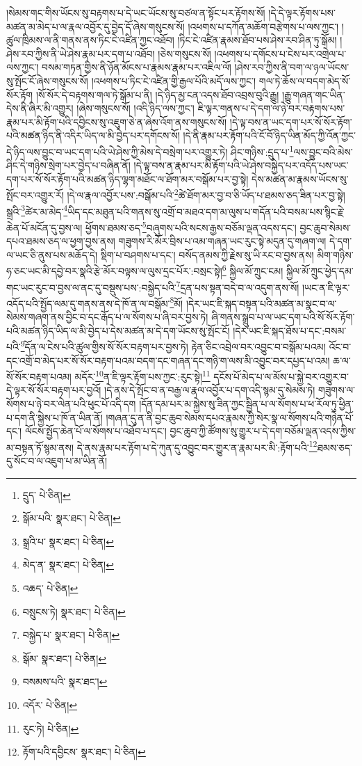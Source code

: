 །སེམས་གང་གིས་ཡོངས་སུ་བརྟགས་པ་དེ་ཡང་ཡོངས་སུ་བཙལ་ན་སྟོང་པར་རྟོགས་སོ། །དེ་དེ་ལྟར་རྟོགས་པས་མཚན་མ་མེད་པ་ལ་རྣལ་འབྱོར་དུ་བྱེད་དོ་ཞེས་གསུངས་སོ། །འཕགས་པ་དཀོན་མཆོག་བརྩེགས་པ་ལས་ཀྱང་། །ཚུལ་ཁྲིམས་ལ་ནི་གནས་ནས་ཏིང་ངེ་འཛིན་ཀྱང་འཐོབ། །ཏིང་ངེ་འཛིན་རྣམས་ཐོབ་པས་ཤེས་རབ་ཤིན་ཏུ་སྒོམ། །ཤེས་རབ་ཀྱིས་ནི་ཡེ་ཤེས་རྣམ་པར་དག་པ་འཐོབ། །ཅེས་གསུངས་སོ། །འཕགས་པ་དགོངས་པ་ངེས་པར་འགྲེལ་པ་ལས་ཀྱང་། བསམ་གཏན་གྱིས་ནི་ཉོན་མོངས་པ་རྣམས་རྣམ་པར་འཇིལ་ལོ། །ཤེས་རབ་ཀྱིས་ནི་བག་ལ་ཉལ་ཡོངས་སུ་སྤོང་ངོ་ཞེས་གསུངས་སོ། །འཕགས་པ་ཏིང་ངེ་འཛིན་གྱི་རྒྱལ་པོའི་མདོ་ལས་ཀྱང་། གལ་ཏེ་ཆོས་ལ་བདག་མེད་སོ་སོར་རྟོག །སོ་སོར་དེ་བརྟགས་གལ་ཏེ་སྒོམ་པ་ནི། །དེ་ཉིད་མྱ་ངན་འདས་ཐོབ་འབྲས་བུའི་རྒྱུ། །རྒྱུ་གཞན་གང་ཡིན་དེས་ནི་ཞིར་མི་འགྱུར། །ཞེས་གསུངས་སོ། །འདི་ཉིད་ལས་ཀྱང་། ཇི་ལྟར་གནས་པ་དེ་དག་ལ་ཉེ་བར་བརྟགས་པས་རྣམ་པར་མི་རྟོག་པའི་དབྱིངས་སུ་འཇུག་ཅེ་ན་ཞེས་འོག་ནས་གསུངས་སོ། །དེ་ལྟ་བས་ན་ཡང་དག་པར་སོ་སོར་རྟོག་པའི་མཚན་ཉིད་ནི་འདིར་ཡིད་ལ་མི་བྱེད་པར་དགོངས་སོ། །དེ་ནི་རྣམ་པར་རྟོག་པའི་ངོ་བོ་ཉིད་ཡིན་མོད་ཀྱི་འོན་ཀྱང་དེ་ཉིད་ལས་བྱུང་བ་ཡང་དག་པའི་ཡེ་ཤེས་ཀྱི་མེས་དེ་བསྲེག་པར་འགྱུར་ཏེ། ཤིང་གཉིས་:དྲུད་པ་\footnote{དྲུད་  པེ་ཅིན། }ལས་བྱུང་བའི་མེས་ཤིང་དེ་གཉིས་སྲེག་པར་བྱེད་པ་བཞིན་ནོ། །དེ་ལྟ་བས་ན་རྣམ་པར་མི་རྟོག་པའི་ཡེ་ཤེས་བསྐྱེད་པར་འདོད་པས་ཡང་དག་པར་སོ་སོར་རྟོག་པའི་མཚན་ཉིད་ལྷག་མཐོང་ལ་ཐོག་མར་བསྒོམ་པར་བྱ་སྟེ། དེས་མཚན་མ་རྣམས་ཡོངས་སུ་སྤོང་བར་འགྱུར་རོ། །དེ་ལ་རྣལ་འབྱོར་པས་:བསྒོམ་པའི་\footnote{སྒོམ་པའི་  སྣར་ཐང་།  པེ་ཅིན། }ཚེ་ཐོག་མར་བྱ་བ་ཅི་ཡོད་པ་ཐམས་ཅད་ཟིན་པར་བྱ་སྟེ། སྒྲའི་\footnote{སྒྲའི་པ་  སྣར་ཐང་།  པེ་ཅིན། }ཚེར་མ་མེད་\footnote{མེད་ན་  སྣར་ཐང་།  པེ་ཅིན། }ཡིད་དང་མཐུན་པའི་གནས་སུ་འགྲོ་བ་མཐའ་དག་མ་ལུས་པ་གདོན་པའི་བསམ་པས་སྙིང་རྗེ་ཆེན་པོ་མངོན་དུ་བྱས་ལ། ཕྱོགས་ཐམས་ཅད་\footnote{འཆད་  པེ་ཅིན། }བཞུགས་པའི་སངས་རྒྱས་བཅོམ་ལྡན་འདས་དང་། བྱང་ཆུབ་སེམས་དཔའ་ཐམས་ཅད་ལ་ཕྱག་བྱས་ནས། གཟུགས་རི་མོར་བྲིས་པ་འམ་གཞན་ཡང་རུང་སྟེ་མདུན་དུ་གཞག་ལ། དེ་དག་ལ་ཡང་ཅི་ནུས་པས་མཆོད་དེ། སྡིག་པ་བཤགས་པ་དང་། བསོད་ནམས་ཀྱི་རྗེས་སུ་ཡི་རང་བ་བྱས་ནས། མིག་གཉིས་ཧ་ཅང་ཡང་མི་དབྱེ་བར་སྣའི་རྩེ་མོར་བལྟས་ལ་ལུས་དྲང་པོར་:བསྲང་སྟེ།\footnote{བསྲུངས་ཏེ།  སྣར་ཐང་།  པེ་ཅིན། } སྐྱིལ་མོ་ཀྲུང་ངམ། སྐྱིལ་མོ་ཀྲུང་ཕྱེད་དམ་གང་ཡང་རུང་བ་བྱས་ལ་ནང་དུ་བསྡུས་པས་:བསྐྱེད་པའི་\footnote{བསྐྱེད་པ་  སྣར་ཐང་།  པེ་ཅིན། }དྲན་པས་སྟན་བདེ་བ་ལ་འདུག་ནས་སོ། །ཡང་ན་ཇི་ལྟར་འདོད་པའི་སྤྱོད་ལམ་དུ་གནས་ནས་དེ་ཁོ་ན་ལ་བསྒོམ་\footnote{སྒོམ་  སྣར་ཐང་།  པེ་ཅིན། }མོ། །དེར་ཡང་ཇི་སྐད་བསྟན་པའི་མཚན་མ་སྣང་བ་ལ་སེམས་གཞག་ནས་བྱིང་བ་དང་རྒོད་པ་ལ་སོགས་པ་ཞི་བར་བྱས་ཏེ། ཞི་གནས་སྒྲུབ་པ་ལ་ཡང་དག་པའི་སོ་སོར་རྟོག་པའི་མཚན་ཉིད་ཡིད་ལ་མི་བྱེད་པ་དེས་མཚན་མ་དེ་དག་ཡོངས་སུ་སྤོང་ངོ། །དེར་ཡང་ཇི་སྐད་ཐོས་པ་དང་:བསམ་པའི་\footnote{བསམས་པའི་  སྣར་ཐང་། }དོན་ལ་ངེས་པའི་ཚུལ་གྱིས་སོ་སོར་བརྟག་པར་བྱས་ཏེ། རྟེན་ཅིང་འབྲེལ་བར་འབྱུང་བ་བསྒོམ་པའམ། འོང་བ་དང་འགྲོ་བ་མེད་པར་སོ་སོར་བརྟག་པའམ་བདག་དང་གཞན་དང་གཉི་ག་ལས་མི་འབྱུང་བར་དཔྱད་པ་འམ། ཆ་ལ་སོ་སོར་བརྟག་པའམ། མདོར་\footnote{འདོར་  པེ་ཅིན། }ན་ཇི་ལྟར་རྟོག་པས་ཀྱང་:རུང་སྟེ།\footnote{རུང་ཏེ།  པེ་ཅིན། } དངོས་པོ་མེད་པ་ལ་མོས་པ་སྐྱེ་བར་འགྱུར་བ་དེ་ལྟར་སོ་སོར་བརྟག་པར་བྱའོ། །དེ་ནས་དེ་སྤོང་བ་ན་བརྒྱ་ལ་རྣལ་འབྱོར་པ་དག་འདི་སྙམ་དུ་སེམས་ཏེ། གཟུགས་ལ་སོགས་པ་ཉེ་བར་ལེན་པའི་ཕུང་པོ་འདི་དག །དོན་དམ་པར་མ་སྐྱེས་སུ་ཟིན་ཀྱང་སྦྱིན་པ་ལ་སོགས་པ་ཕ་རོལ་ཏུ་ཕྱིན་པ་དག་ནི་སྐྱེས་པ་ཁོ་ན་ཡིན་ནོ། །གཞན་དུ་ན་ནི་བྱང་ཆུབ་སེམས་དཔའ་རྣམས་ཀྱི་སེར་སྣ་ལ་སོགས་པའི་གཉེན་པོ་དང་། ལོངས་སྤྱོད་ཆེན་པོ་ལ་སོགས་པ་འཐོབ་པ་དང་། བྱང་ཆུབ་ཀྱི་ཚོགས་སུ་གྱུར་པ་དེ་དག་བཅོམ་ལྡན་འདས་ཀྱིས་མ་བསྟན་ཏོ་སྙམ་ནས། དེ་ནས་རྣམ་པར་རྟོག་པ་དེ་ཀུན་དུ་འབྱུང་བར་གྱུར་ན་རྣམ་པར་མི་:རྟོག་པའི་\footnote{རྟོག་པའི་དབྱིངས་  སྣར་ཐང་།  པེ་ཅིན། }ཐམས་ཅད་དུ་སོང་བ་ལ་འཇུག་པ་མ་ཡིན་ནོ། 